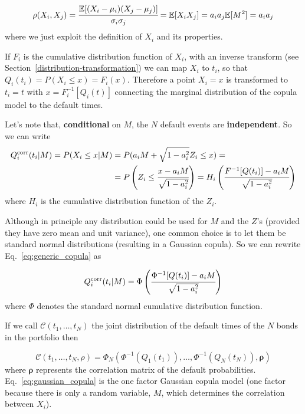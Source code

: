 \begin{equation*}
\rho(X_i, X_j) = \cfrac{\mathbb{E}[(X_i-\mu_i)(X_j-\mu_j)]}{\sigma_{i}\sigma_{j}} = \mathbb{E}[X_i X_j] = a_i a_j \mathbb{E}[M^2] = a_i a_j
\end{equation*}
where we just exploit the definition of $X_i$ and its properties.

If $F_i$ is the cumulative distribution function of $X_i$, with an inverse transform (see Section~\ref{distribution-transformation}) we can map $X_i$ to $t_i$, so that $Q_i(t_i) = P(X_i\le x)=F_i(x)$. Therefore a point $X_i = x$ is transformed to $t_i = t$ with $x = F_i^{-1}[Q_i(t)]$ connecting the marginal distribution of the copula model to the default times.

Let's note that, \textbf{conditional} on $M$, the $N$ default events are \textbf{independent}. So we can write
\begin{equation}
\begin{split}
Q_i^{\textrm{corr}}(t_i|M) = P(X_i\le x|M) &= P(a_i M + \sqrt{1-a_i^2}Z_i\le x) =\\
&= P\left(Z_i\le \cfrac{x-a_i M}{\sqrt{1-a_i^2}}\right)
=H_i\left(\cfrac{F^{-1}[Q(t_i)]-a_i M}{\sqrt{1-a_i^2}}\right)
\end{split}
\label{eq:generic_copula}
\end{equation}
where $H_i$ is the cumulative distribution function of the $Z_i$.

Although in principle any distribution could be used for $M$ and the $Z$'s (provided they have zero mean and unit variance), one common choice is to let them be standard normal distributions (resulting in a Gaussian copula).
So we can rewrite Eq.~\ref{eq:generic_copula} as

\begin{equation}
Q_i^{\textrm{corr}}(t_i|M) = \Phi\left(\cfrac{\Phi^{-1}[Q(t_i)]-a_i M}{\sqrt{1-a_i^2}}\right)
\label{eq:gaussian_one_factor_copula}
\end{equation}
where $\Phi$ denotes the standard normal cumulative distribution function.

If we call $\mathcal{C}(t_1,\ldots,t_N)$ the joint distribution of the default times of the $N$ bonds in the portfolio then

\begin{equation}
\mathcal{C}(t_1,\ldots,t_N, \rho)=\Phi_{N}(\Phi^{-1}(Q_1(t_1)),\ldots,\Phi^{-1}(Q_N(t_N)), \boldsymbol{\rho})
\label{eq:gaussian_copula}
\end{equation}
where $\boldsymbol{\rho}$ represents the correlation matrix of the default probabilities. Eq.~\ref{eq:gaussian_copula} is the one factor Gaussian copula model (one factor because there is only a random variable, $M$, which determines the correlation between $X_i$).

